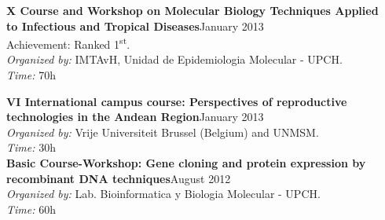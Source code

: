 \documentclass[margin,line]{res}
\begin{document}
\begin{resume}
{\bf X Course and Workshop on Molecular Biology Techniques Applied \\to Infectious and Tropical Diseases}\hfill {January 2013}\\
Achievement: Ranked 1\textsuperscript{st}.\\
\textit{Organized by:} IMTAvH, Unidad de Epidemiologia Molecular - UPCH.\\
\textit{Time:} 70h

{\bf VI International campus course: Perspectives of reproductive \\technologies in the Andean Region}\hfill {January 2013}\\
\textit{Organized by:} Vrije Universiteit Brussel (Belgium) and UNMSM.\\
\textit{Time:} 30h\\

{\bf Basic Course-Workshop: Gene cloning and protein expression by \\recombinant DNA techniques}\hfill {August 2012}\\
\textit{Organized by:} Lab. Bioinformatica y Biologia Molecular - UPCH.\\
\textit{Time:} 60h




\end{resume}
\end{document}

